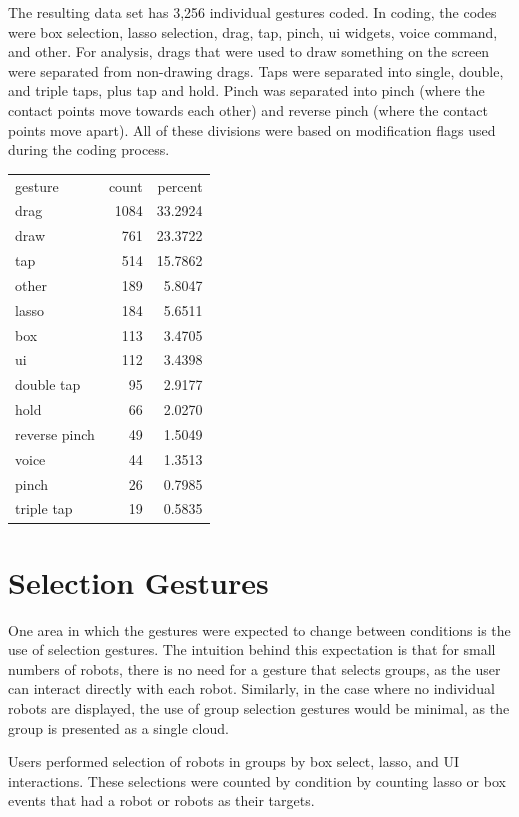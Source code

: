 The resulting data set has 3,256 individual gestures coded. 
In coding, the codes were box selection, lasso selection, drag, tap, pinch, ui widgets, voice command, and other. 
For analysis, drags that were used to draw something on the screen were separated from non-drawing drags. 
Taps were separated into single, double, and triple taps, plus tap and hold. 
Pinch was separated into pinch (where the contact points move towards each other) and reverse pinch (where the contact points move apart).
All of these divisions were based on modification flags used during the coding process.  

\begin{tabular}{l r r}
gesture & count & percent\\
drag & 1084 & 33.2924 \\
draw & 761 & 23.3722 \\
tap & 514 & 15.7862\\
other & 189 & 5.8047 \\
lasso & 184 & 5.6511 \\
box & 113 & 3.4705 \\
ui & 112 & 3.4398\\
double tap & 95 & 2.9177 \\
hold & 66 & 2.0270\\
reverse pinch & 49 & 1.5049 \\
voice & 44 & 1.3513\\
pinch & 26 & 0.7985 \\
triple tap & 19 & 0.5835\\
\end{tabular}

\section{Selection Gestures} \label{section:Selection_Gestures}
One area in which the gestures were expected to change between conditions is the use of selection gestures. 
The intuition behind this expectation is that for small numbers of robots, there is no need for a gesture that selects groups, as the user can interact directly with each robot. 
Similarly, in the case where no individual robots are displayed, the use of group selection gestures would be minimal, as the group is presented as a single cloud. 

Users performed selection of robots in groups by box select, lasso, and UI interactions.
These selections were counted by condition by counting lasso or box events that had a robot or robots as their targets. 
 
